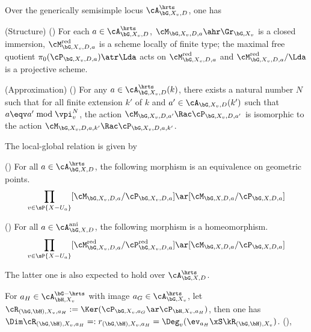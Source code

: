 \documentclass[a4paper, twoside]{article}
\begin{document}
\begin{thm}
	Over the generically semisimple locus $\cA_{\bG,X_{v},D}^{\hrts}$, one has
	\begin{itm}
		\item (Structure) (\cite[Proposition~3.2.1, Proposition~3.4.1]{Ngo2010Lemme}) For each $a\in\cA_{\bG,X_{v},D}^{\hrts}$, $\cM_{\bG,X_{v},D,a}\ahr\Gr_{\bG,X_{v}}$ is a closed immersion, $\cM_{\bG,X_{v},D,a}^{\text{red}}$ is a scheme locally of finite type; the maximal free quotient $\pi_{0}(\cP_{\bG,X_{v},D,a})\atr\Lda$ acts on $\cM_{\bG,X_{v},D,a}^{\text{red}}$ and $\cM_{\bG,X_{v},D,a}^{\text{red}}/\Lda$ is a projective scheme.
		\item (Approximation) (\cite[Proposition~3.5.1]{Ngo2010Lemme}) For any $a\in\cA_{\bG,X_{v},D}^{\hrts}(k)$, there exists a natural number $N$ such that for all finite extension $k'$ of $k$ and $a'\in\cA_{\bG,X_{v},D}(k')$ such that $a\eqv a'\bmod{\vpi_{v}^{N}}$, the action $\cM_{\bG,X_{v},D,a'}\Rac\cP_{\bG,X_{v},D,a'}$ is isomorphic to the action $\cM_{\bG,X_{v},D,a,k'}\Rac\cP_{\bG,X_{v},D,a,k'}$.
	\end{itm}
\end{thm}

\begin{thm}
	The local-global relation is given by
	\begin{itm}
		\item (\cite[Theorem~4.6]{Ngo2006Hitchin}) For all $a\in\cA_{\bG,X,D}^{\hrts}$, the following morphism is an equivalence on geometric points.
		\[
			\prod_{v\in \sP{X-U_{a}}}[\cM_{\bG,X_{v},D,a}/\cP_{\bG,X_{v},D,a}]\ar[\cM_{\bG,X,D,a}/\cP_{\bG,X,D,a}]
		\]
		\item (\cite[Proposition~4.15.1]{Ngo2010Lemme}) For all $a\in\cA_{\bG,X,D}^{\text{ani}}$, the following morphism is a homeomorphism.
		\[
			\prod_{v\in \sP{X-U_{a}}}[\cM_{\bG,X_{v},D,a}^{\text{red}}/\cP_{\bG,X_{v},D,a}^{\text{red}}]\ar[\cM_{\bG,X,D,a}/\cP_{\bG,X,D,a}]
		\]
	\end{itm}
\end{thm}

\begin{rmk}
	The latter one is also expected to hold over $\cA_{\bG,X,D}^{\hrts}$.
\end{rmk}


\begin{stp}
	For $a_{H}\in\cA_{\bH,X_{v}}^{\bG-\hrts}$ with image $a_{G}\in\cA_{\bG,X_{v}}^{\hrts}$, let $\cR_{(\bG,\bH),X_{v},a_{H}}:=\Ker(\cP_{\bG,X_{v},a_{G}}\ar\cP_{\bH,X_{v},a_{H}})$, then one has $\Dim\cR_{(\bG,\bH),X_{v},a_{H}}=:r_{(\bG,\bH),X_{v},a_{H}}=\Deg_{v}(\ev_{a_{H}}\xS\kR_{(\bG,\bH),X_{v}})$.
	(\cite[Lemma~3.11.2]{Ngo2010Lemme}),
\end{stp}
\end{document}
